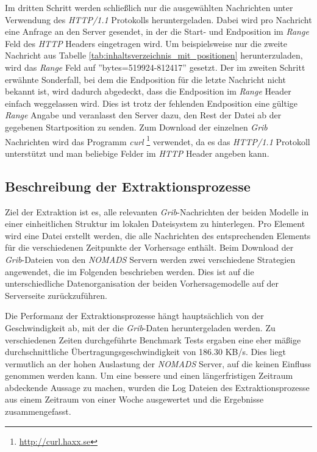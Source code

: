 Im dritten Schritt werden schließlich nur die ausgewählten Nachrichten
unter Verwendung des \textit{HTTP/1.1} Protokolls
heruntergeladen. Dabei wird pro Nachricht eine Anfrage an den Server
gesendet, in der die Start- und Endposition im \textit{Range} Feld des
\textit{HTTP} Headers eingetragen wird. Um beispielsweise nur die
zweite Nachricht aus Tabelle
\ref{tab:inhaltsverzeichnis_mit_positionen} herunterzuladen, wird das
\textit{Range} Feld auf ''bytes=519924-812417'' gesetzt. Der im
zweiten Schritt erwähnte Sonderfall, bei dem die Endposition für die
letzte Nachricht nicht bekannt ist, wird dadurch abgedeckt, dass die
Endposition im \textit{Range} Header einfach weggelassen wird. Dies
ist trotz der fehlenden Endposition eine gültige \textit{Range} Angabe
und veranlasst den Server dazu, den Rest der Datei ab der gegebenen
Startposition zu senden. Zum Download der einzelnen \textit{Grib}
Nachrichten wird das Programm \textit{curl}
\footnote{\url{http://curl.haxx.se}} verwendet, da es das
\textit{HTTP/1.1} Protokoll unterstützt und man beliebige Felder im
\textit{HTTP} Header angeben kann.

\subsection{Beschreibung der Extraktionsprozesse}
Ziel der Extraktion ist es, alle relevanten \textit{Grib}-Nachrichten
der beiden Modelle in einer einheitlichen Struktur im lokalen
Dateisystem zu hinterlegen. Pro Element wird eine Datei erstellt
werden, die alle Nachrichten des entsprechenden Elements für die
verschiedenen Zeitpunkte der Vorhersage enthält. Beim Download der
\textit{Grib}-Dateien von den \textit{NOMADS} Servern werden zwei
verschiedene Strategien angewendet, die im Folgenden beschrieben
werden. Dies ist auf die unterschiedliche Datenorganisation der beiden
Vorhersagemodelle auf der Serverseite zurückzuführen.

Die Performanz der Extraktionsprozesse hängt hauptsächlich von der
Geschwindigkeit ab, mit der die \textit{Grib}-Daten heruntergeladen
werden. Zu verschiedenen Zeiten durchgeführte Benchmark Tests ergaben
eine eher mäßige durchschnittliche Übertragungsgeschwindigkeit von
186.30 KB/s. Dies liegt vermutlich an der hohen Auslastung der
\textit{NOMADS} Server, auf die keinen Einfluss genommen werden
kann. Um eine bessere und einen längerfristigen Zeitraum abdeckende
Aussage zu machen, wurden die Log Dateien des Extraktionsprozesse aus
einem Zeitraum von einer Woche ausgewertet und die Ergebnisse
zusammengefasst.

